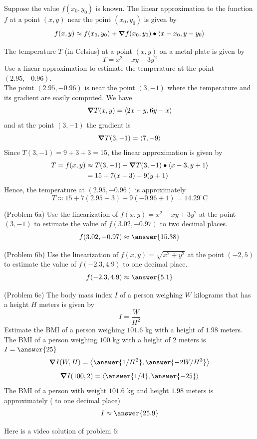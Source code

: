 \documentclass[handout]{ximera}
\begin{document}
Suppose the value $f(x_0, y_0)$ is known. 
The linear approximation to the function $f$ at a point $(x,y)$ near 
the point $(x_0, y_0)$ is given by
\[
f(x,y) \approx f(x_0, y_0) + \boldsymbol\nabla f(x_0,y_0) \bullet \left\langle x - x_0, y-y_0\right\rangle
\]

\begin{example}[Example 6]
The temperature $T$ (in Celsius) at a point $(x,y)$ on a metal plate is given by 
\[
T = x^2 - xy + 3y^2
\]
Use a linear approximation to estimate the temperature at the point $(2.95, -0.96)$.\\
The point $(2.95, -0.96)$ is near the point $(3,-1)$ where the temperature 
and its gradient are easily computed. We have
\[
\boldsymbol\nabla T(x,y) = \left\langle 2x - y, 6y - x\right\rangle
\]
and at the point $(3, -1)$ the gradient is
\[
\boldsymbol\nabla T(3, -1) = \left\langle 7, -9\right\rangle
\]
Since $T(3, -1) = 9 + 3 + 3 = 15$, the linear approximation is given by
\begin{align*}
T = f(x,y) &\approx T(3, -1) + \boldsymbol\nabla T(3, -1) \bullet \left\langle x-3, y+1\right\rangle\\
           &= 15 + 7(x-3) - 9(y+1)
\end{align*}
Hence, the temperature at $(2.95, -0.96)$ is approximately
\[
T \approx 15 + 7(2.95 - 3) - 9(-0.96 + 1) = 14.29^\circ \text{C}
\]
\end{example}

\begin{problem}(Problem 6a)
Use the linearization of $f(x,y) = x^2 - xy + 3y^2$ at the point $(3, -1)$ to estimate 
the value of $f(3.02, -0.97)$ to two decimal places.\\
\[
f(3.02, -0.97) \approx \answer{15.38}
\]
\end{problem}  
 \begin{problem}(Problem 6b)
Use the linearization of $f(x,y) = \sqrt{x^2 + y^2}$ at the point $(-2, 5)$ to estimate 
the value of $f(-2.3, 4.9)$ to one decimal place.\\
\[
f(-2.3, 4.9) \approx \answer{5.1}
\]
\end{problem}  
\begin{problem}(Problem 6c)
The body mass index $I$ of a person weighing $W$ kilograms that has 
a height $H$ meters is given by
\[
I = \frac{W}{H^2}
\]
Estimate the BMI of a person weighing $101.6$ kg with a height of $1.98$ meters.\\
The BMI of a person weighing $100$ kg with a height of $2$ meters is $I = \answer{25}$
\[
\grad I(W,H) = \vector{\answer{1/H^2}, \answer{-2W/H^3}}
\]
\[
\grad I(100, 2) = \vector{\answer{1/4}, \answer{-25}}
\]
The BMI of a person with weight $101.6$ kg and height $1.98$ meters is 
approximately ( to one decimal place)
\[
I \approx \answer{25.9}
\]
\end{problem}

Here is a video solution of problem 6:\\
\begin{foldable}
\end{foldable}
\end{document}
